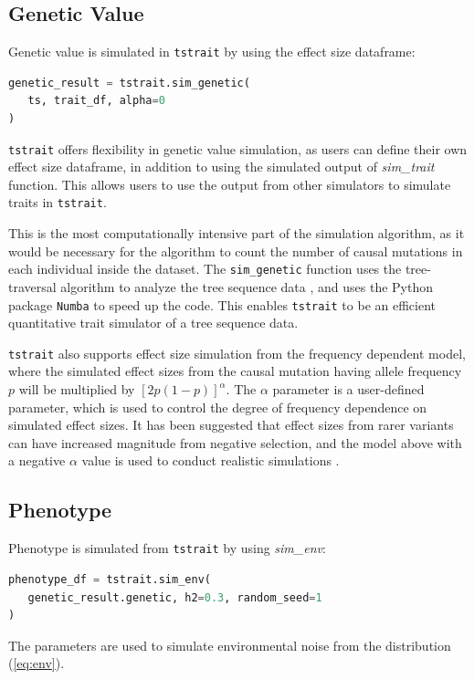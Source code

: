 \documentclass[unnumsec,webpdf,modern,large,namedate]{oup-authoring-template}%
\begin{document}
\subsection{Genetic Value}

Genetic value is simulated in \texttt{tstrait} by using the effect size dataframe:
\begin{lstlisting}[language=Python]
genetic_result = tstrait.sim_genetic(
   ts, trait_df, alpha=0
)
\end{lstlisting}
\texttt{tstrait} offers flexibility in genetic value simulation, as users can
define their own effect size dataframe, in addition to using the simulated
output of \emph{sim\_trait} function. This allows users to use the output from
other simulators to simulate traits in \texttt{tstrait}.

This is the most computationally intensive part of the simulation algorithm, as
it would be necessary for the algorithm to count the number of causal mutations
in each individual inside the dataset. The \texttt{sim\_genetic} function uses
the tree-traversal algorithm to analyze the tree sequence data
\citep{ralph2020}, and uses the Python package \texttt{Numba} \citep{numba} to
speed up the code. This enables \texttt{tstrait} to be an efficient
quantitative trait simulator of a tree sequence data.

\texttt{tstrait} also supports effect size simulation from the frequency
dependent model, where the simulated effect sizes from the causal mutation
having allele frequency $p$ will be multiplied by $[2p(1-p)]^\alpha$. The
$\alpha$ parameter is a user-defined parameter, which is used to control the
degree of frequency dependence on simulated effect sizes. It has been suggested
that effect sizes from rarer variants can have increased magnitude from
negative selection, and the model above with a negative $\alpha$ value is used
to conduct realistic simulations \citep{speed2017}.

\subsection{Phenotype}

Phenotype is simulated from \texttt{tstrait} by using \emph{sim\_env}:
\begin{lstlisting}[language=Python]
phenotype_df = tstrait.sim_env(
   genetic_result.genetic, h2=0.3, random_seed=1
)
\end{lstlisting}
The parameters are used to simulate environmental noise from the distribution (\ref{eq:env}).
\end{document}
